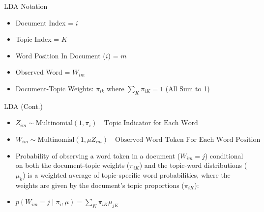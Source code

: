 \documentclass[
  ignorenonframetext,
  aspectratio=169]{beamer}
\begin{document}
\begin{frame}{LDA Notation}
\label{lda-notation}
\begin{itemize}
\item Document Index = $i$ \par \vspace{2.5mm}
\item Topic Index = $K$ \par \vspace{2.5mm}
\item Word Position In Document ($i$) = $m$ \par \vspace{2.5mm}
\item Observed Word = $W_{im}$ \par \vspace{2.5mm}
\item Document-Topic Weights: $\pi_{ik}$ where $\sum_{K}\pi_{iK} =1$ (All Sum to 1) 
\end{itemize}
\end{frame}

\begin{frame}{LDA (Cont.)}
\label{lda-cont.}
\begin{itemize}
\item[] \centering $Z_{im} \sim \text{Multinomial}(1,\pi_i) \quad \text{Topic Indicator for Each Word} $ \par \vspace{2.5mm}
\item[] \centering  $W_{im} \sim \text{Multinomial}(1, \mu{Z_{im}}) \quad \text{Observed Word Token For Each Word Position}$ \par \vspace{2.5mm}
\item \raggedright Probability of observing a word token in a document ($W_{im} = j$) conditional on both the document-topic weights ($\pi_{iK}$) and the topic-word distributions ($\mu_k$) is a weighted average of topic-specific word probabilities, where the weights are given by the document's topic proportions ($\pi_{iK}$): \par \vspace{2.5mm}
\item[] \centering  $ p(W_{im} = j \mid \pi_i,\mu) = \sum_K\pi_{iK}\mu_{jK}$
\end{itemize}
\end{frame}
\end{document}
